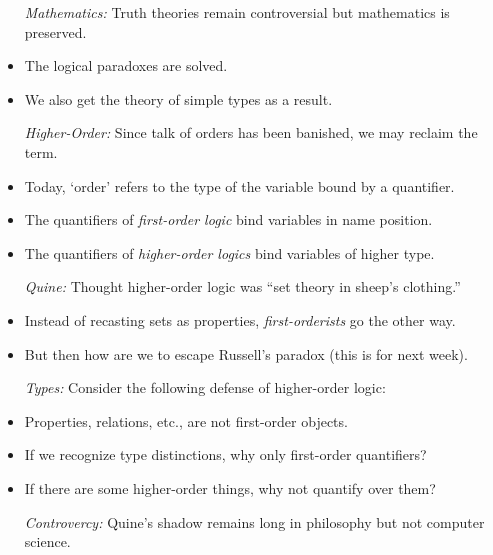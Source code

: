 \documentclass[a4paper, 11pt]{article} %
\begin{document}
  \begin{itemize}
    \item[\it Mathematics:] Truth theories remain controversial but mathematics is preserved.
      \item The logical paradoxes are solved.
      \item We also get the theory of simple types as a result.
    \item[\it Higher-Order:] Since talk of orders has been banished, we may reclaim the term.
      \item Today, `order' refers to the type of the variable bound by a quantifier. 
      \item The quantifiers of \textit{first-order logic} bind variables in name position.
      \item The quantifiers of \textit{higher-order logics} bind variables of higher type.
    \item[\it Quine:] Thought higher-order logic was ``set theory in sheep's clothing.''
      \item Instead of recasting sets as properties, \textit{first-orderists} go the other way.
      \item But then how are we to escape Russell's paradox (this is for next week).
    \item[\it Types:] Consider the following defense of higher-order logic:
      \item Properties, relations, etc., are not first-order objects.
      \item If we recognize type distinctions, why only first-order quantifiers?
      \item If there are some higher-order things, why not quantify over them?
    \item[\it Controvercy:] Quine's shadow remains long in philosophy but not computer science.
  \end{itemize}
\end{document}
